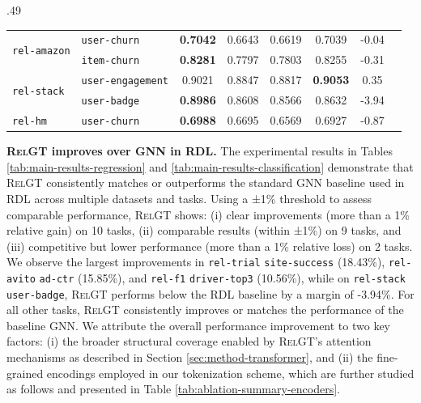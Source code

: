 \documentclass{article} %
\newcommand{\RelGT}{\textsc{RelGT}\xspace}
\begin{document}
\begin{table}
\begin{subtable}{.49\textwidth}
{\begin{tabular}{llcccccc}
 \midrule
\multirow{2}{*}{\texttt{rel-amazon}}
 & \multirow{1}{*}{\texttt{user-churn}} & \textbf{0.7042} & 0.6643 & 0.6619 & 0.7039 & \cellcolor{mediumred}-0.04 \\
 & \multirow{1}{*}{\texttt{item-churn}} & \textbf{0.8281} & 0.7797 & 0.7803 & 0.8255 & \cellcolor{mediumred}-0.31\\

 \midrule
\multirow{2}{*}{\texttt{rel-stack}}
 & \multirow{1}{*}{\texttt{user-engagement}}  & 0.9021 & 0.8847  & 0.8817 & \textbf{0.9053} & \cellcolor{lightblue}0.35 \\
 & \multirow{1}{*}{\texttt{user-badge}} & \textbf{0.8986} & 0.8608 & 0.8566 & 0.8632 & \cellcolor{mediumred}-3.94 \\

\midrule
\multirow{1}{*}{\texttt{rel-hm}}
 & \multirow{1}{*}{\texttt{user-churn}} & \textbf{0.6988} & 0.6695 & 0.6569 & 0.6927 &  \cellcolor{mediumred}-0.87 \\

\bottomrule
\end{tabular}
}
\end{subtable}
\vspace{-10pt}
\label{tab:main-results}
\end{table}





\textbf{\RelGT improves over GNN in RDL.} 
The experimental results in Tables \ref{tab:main-results-regression} and \ref{tab:main-results-classification} demonstrate that \RelGT consistently matches or outperforms the standard GNN baseline used in RDL \citep{robinson2025relbench} across multiple datasets and tasks. Using a ±1\% threshold to assess comparable performance, \RelGT shows: (i) clear improvements (more than a 1\% relative gain) on 10 tasks, (ii) comparable results (within ±1\%) on 9 tasks, and (iii) competitive but lower performance (more than a 1\% relative loss) on 2 tasks. We observe the largest improvements in \texttt{rel-trial} \texttt{site-success} (18.43\%), \texttt{rel-avito} \texttt{ad-ctr} (15.85\%), and \texttt{rel-f1} \texttt{driver-top3} (10.56\%), while on \texttt{rel-stack} \texttt{user-badge}, \RelGT performs below the RDL baseline by a margin of -3.94\%. For all other tasks, \RelGT consistently improves or matches the performance of the baseline GNN. We attribute the overall performance improvement to two key factors: (i) the broader structural coverage enabled by \RelGT's attention mechanisms as described in Section \ref{sec:method-transformer}, and (ii) the fine-grained encodings employed in our tokenization scheme, which are further studied as follows and presented in Table \ref{tab:ablation-summary-encoders}.
\end{document}
